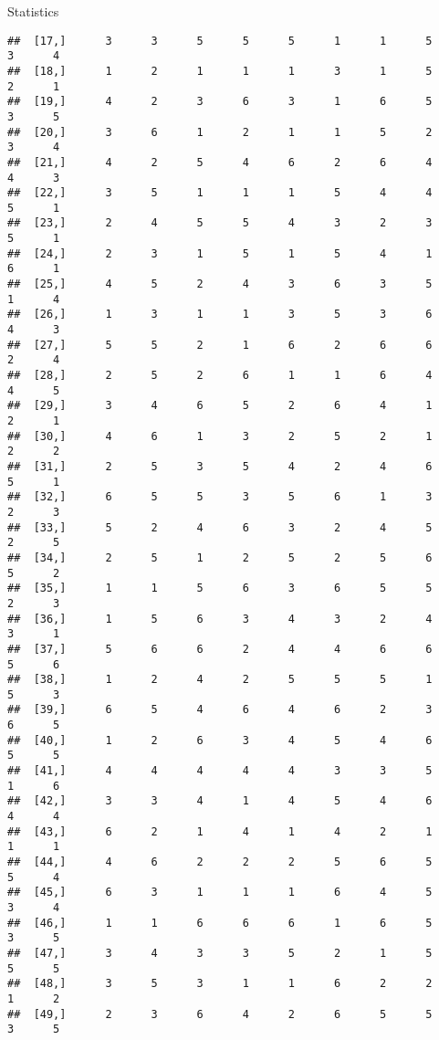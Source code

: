 \documentclass[
  ignorenonframetext,
]{beamer}
\begin{document}
\begin{frame}[fragile]{Statistics}
\begin{verbatim}
##  [17,]      3      3      5      5      5      1      1      5      3      4
##  [18,]      1      2      1      1      1      3      1      5      2      1
##  [19,]      4      2      3      6      3      1      6      5      3      5
##  [20,]      3      6      1      2      1      1      5      2      3      4
##  [21,]      4      2      5      4      6      2      6      4      4      3
##  [22,]      3      5      1      1      1      5      4      4      5      1
##  [23,]      2      4      5      5      4      3      2      3      5      1
##  [24,]      2      3      1      5      1      5      4      1      6      1
##  [25,]      4      5      2      4      3      6      3      5      1      4
##  [26,]      1      3      1      1      3      5      3      6      4      3
##  [27,]      5      5      2      1      6      2      6      6      2      4
##  [28,]      2      5      2      6      1      1      6      4      4      5
##  [29,]      3      4      6      5      2      6      4      1      2      1
##  [30,]      4      6      1      3      2      5      2      1      2      2
##  [31,]      2      5      3      5      4      2      4      6      5      1
##  [32,]      6      5      5      3      5      6      1      3      2      3
##  [33,]      5      2      4      6      3      2      4      5      2      5
##  [34,]      2      5      1      2      5      2      5      6      5      2
##  [35,]      1      1      5      6      3      6      5      5      2      3
##  [36,]      1      5      6      3      4      3      2      4      3      1
##  [37,]      5      6      6      2      4      4      6      6      5      6
##  [38,]      1      2      4      2      5      5      5      1      5      3
##  [39,]      6      5      4      6      4      6      2      3      6      5
##  [40,]      1      2      6      3      4      5      4      6      5      5
##  [41,]      4      4      4      4      4      3      3      5      1      6
##  [42,]      3      3      4      1      4      5      4      6      4      4
##  [43,]      6      2      1      4      1      4      2      1      1      1
##  [44,]      4      6      2      2      2      5      6      5      5      4
##  [45,]      6      3      1      1      1      6      4      5      3      4
##  [46,]      1      1      6      6      6      1      6      5      3      5
##  [47,]      3      4      3      3      5      2      1      5      5      5
##  [48,]      3      5      3      1      1      6      2      2      1      2
##  [49,]      2      3      6      4      2      6      5      5      3      5

\end{verbatim}
\end{frame}
\end{document}
